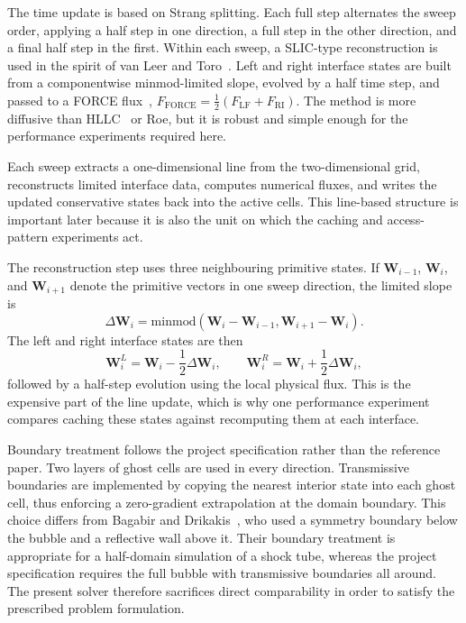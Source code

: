 \documentclass[final,3p,times,twocolumn]{elsarticle}
\begin{document}
The time update is based on Strang splitting. Each full step alternates the sweep order, applying a half step in one direction, a full step in the other direction, and a final half step in the first. Within each sweep, a SLIC-type reconstruction is used in the spirit of van Leer and Toro~\cite{vanleer1979,toro2009}. Left and right interface states are built from a componentwise minmod-limited slope, evolved by a half time step, and passed to a FORCE flux~\cite{toro2009}, \(F_{\mathrm{FORCE}} = \tfrac{1}{2}(F_{\mathrm{LF}} + F_{\mathrm{RI}})\). The method is more diffusive than HLLC~\cite{toro1994} or Roe, but it is robust and simple enough for the performance experiments required here.

Each sweep extracts a one-dimensional line from the two-dimensional grid, reconstructs limited interface data, computes numerical fluxes, and writes the updated conservative states back into the active cells. This line-based structure is important later because it is also the unit on which the caching and access-pattern experiments act.

The reconstruction step uses three neighbouring primitive states. If $\mathbf{W}_{i-1}$, $\mathbf{W}_{i}$, and $\mathbf{W}_{i+1}$ denote the primitive vectors in one sweep direction, the limited slope is
\begin{equation}
\Delta \mathbf{W}_{i} = \mathrm{minmod}\left(\mathbf{W}_{i} - \mathbf{W}_{i-1},
\mathbf{W}_{i+1} - \mathbf{W}_{i}\right).
\end{equation}
The left and right interface states are then
\begin{equation}
\mathbf{W}_{i}^{L} = \mathbf{W}_{i} - \frac{1}{2}\Delta \mathbf{W}_{i}, \qquad
\mathbf{W}_{i}^{R} = \mathbf{W}_{i} + \frac{1}{2}\Delta \mathbf{W}_{i},
\end{equation}
followed by a half-step evolution using the local physical flux. This is the expensive part of the line update, which is why one performance experiment compares caching these states against recomputing them at each interface.

Boundary treatment follows the project specification rather than the reference paper. Two layers of ghost cells are used in every direction. Transmissive boundaries are implemented by copying the nearest interior state into each ghost cell, thus enforcing a zero-gradient extrapolation at the domain boundary. This choice differs from Bagabir and Drikakis~\cite{bagabir2001}, who used a symmetry boundary below the bubble and a reflective wall above it. Their boundary treatment is appropriate for a half-domain simulation of a shock tube, whereas the project specification requires the full bubble with transmissive boundaries all around. The present solver therefore sacrifices direct comparability in order to satisfy the prescribed problem formulation.
\end{document}
